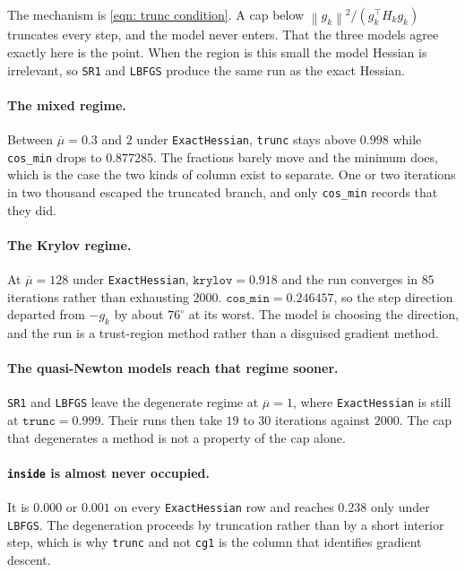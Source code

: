 \documentclass[11pt,a4paper]{article}
\providecommand{\norm}[1]{\left \lVert #1 \right \rVert}
\theoremstyle{remark}
\begin{document}
The mechanism is \eqref{eqn: trunc condition}. A cap below
$\norm{g_k}^2/(g_k^{\!\top}H_kg_k)$ truncates every step, and the model never
enters. That the three models agree exactly here is the point. When the region is
this small the model Hessian is irrelevant, so \texttt{SR1} and \texttt{LBFGS}
produce the same run as the exact Hessian.

\paragraph{The mixed regime.}
Between $\overline{\mu} = 0.3$ and $2$ under \texttt{ExactHessian}, \texttt{trunc}
stays above $0.998$ while \texttt{cos\_min} drops to $0.877285$. The fractions
barely move and the minimum does, which is the case the two kinds of column exist
to separate. One or two iterations in two thousand escaped the truncated branch,
and only \texttt{cos\_min} records that they did.

\paragraph{The Krylov regime.}
At $\overline{\mu} = 128$ under \texttt{ExactHessian}, $\texttt{krylov} = 0.918$
and the run converges in $85$ iterations rather than exhausting $2000$.
$\texttt{cos\_min} = 0.246457$, so the step direction departed from $-g_k$ by
about $76^\circ$ at its worst. The model is choosing the direction, and the run
is a trust-region method rather than a disguised gradient method.

\paragraph{The quasi-Newton models reach that regime sooner.}
\texttt{SR1} and \texttt{LBFGS} leave the degenerate regime at
$\overline{\mu} = 1$, where \texttt{ExactHessian} is still at
$\texttt{trunc} = 0.999$. Their runs then take $19$ to $30$ iterations against
$2000$. The cap that degenerates a method is not a property of the cap alone.

\paragraph{\texttt{inside} is almost never occupied.}
It is $0.000$ or $0.001$ on every \texttt{ExactHessian} row and reaches $0.238$
only under \texttt{LBFGS}. The degeneration proceeds by truncation rather than by
a short interior step, which is why \texttt{trunc} and not \texttt{cg1} is the
column that identifies gradient descent.
\end{document}
